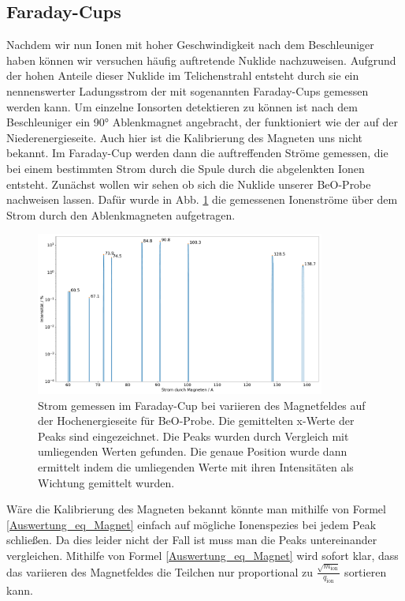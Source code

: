 \subsection{Faraday-Cups}
Nachdem wir nun Ionen mit hoher Geschwindigkeit nach dem Beschleuniger haben können wir versuchen häufig auftretende Nuklide nachzuweisen.
Aufgrund der hohen Anteile dieser Nuklide im Telichenstrahl entsteht durch sie ein nennenswerter Ladungsstrom der mit sogenannten Faraday-Cups gemessen werden kann.
Um einzelne Ionsorten detektieren zu können ist nach dem Beschleuniger ein \ang{90} Ablenkmagnet angebracht, der funktioniert wie der auf der Niederenergieseite.
Auch hier ist die Kalibrierung des Magneten uns nicht bekannt.
Im Faraday-Cup werden dann die auftreffenden Ströme gemessen, die bei einem bestimmten Strom durch die Spule durch die abgelenkten Ionen entsteht.
Zunächst wollen wir sehen ob sich die Nuklide unserer BeO-Probe nachweisen lassen.
Dafür wurde in Abb. \ref{Auswertung_Bild_Faraday_Cup_BeO_HE} die gemessenen Ionenströme über dem Strom durch den Ablenkmagneten aufgetragen.
\begin{figure}[ht]
	\centering
    \includegraphics[width=0.85\textwidth]{Pictures/Faraday_Cup_BeO_HE.pdf}
	\caption{Strom gemessen im Faraday-Cup bei variieren des Magnetfeldes auf der Hochenergieseite für BeO-Probe. Die gemittelten x-Werte der Peaks sind eingezeichnet. Die Peaks wurden durch Vergleich mit umliegenden Werten gefunden. Die genaue Position wurde dann ermittelt indem die umliegenden Werte mit ihren Intensitäten als Wichtung gemittelt wurden.}
	\label{Auswertung_Bild_Faraday_Cup_BeO_HE}
\end{figure}
Wäre die Kalibrierung des Magneten bekannt könnte man mithilfe von Formel \ref{Auswertung_eq_Magnet} einfach auf mögliche Ionenspezies bei jedem Peak schließen.
Da dies leider nicht der Fall ist muss man die Peaks untereinander vergleichen.
Mithilfe von Formel \ref{Auswertung_eq_Magnet} wird sofort klar, dass das variieren des Magnetfeldes die Teilchen nur proportional zu $\frac{\sqrt{m_{\text{ion}}}}{q_{\text{ion}}}$ sortieren kann.
